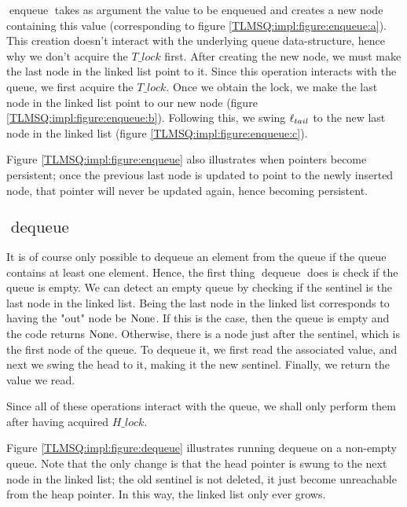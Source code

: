 \documentclass[twoside,11pt,openright]{report}
\newcommand{\enqueue}{\operatorname{enqueue}}
\newcommand{\dequeue}{\operatorname{dequeue}}
\begin{document}
$\enqueue$ takes as argument the value to be enqueued and creates a new node containing this value (corresponding to figure \ref{TLMSQ:impl:figure:enqueue:a}). This creation doesn't interact with the underlying queue data-structure, hence why we don't acquire the $T\_lock$ first. After creating the new node, we must make the last node in the linked list point to it. Since this operation interacts with the queue, we first acquire the $T\_lock$. Once we obtain the lock, we make the last node in the linked list point to our new node (figure \ref{TLMSQ:impl:figure:enqueue:b}). Following this, we swing $\ell_{tail}$ to the new last node in the linked list (figure \ref{TLMSQ:impl:figure:enqueue:c}).

Figure \ref{TLMSQ:impl:figure:enqueue} also illustrates when pointers become persistent; once the previous last node is updated to point to the newly inserted node, that pointer will never be updated again, hence becoming persistent.

\subsection[dequeue]{$\dequeue$}

It is of course only possible to dequeue an element from the queue if the queue contains at least one element. Hence, the first thing $\dequeue$ does is check if the queue is empty. We can detect an empty queue by checking if the sentinel is the last node in the linked list. Being the last node in the linked list corresponds to having the "out" node be $\operatorname{None}$. If this is the case, then the queue is empty and the code returns $\operatorname{None}$. Otherwise, there is a node just after the sentinel, which is the first node of the queue. To dequeue it, we first read the associated value, and next we swing the head to it, making it the new sentinel. Finally, we return the value we read.

Since all of these operations interact with the queue, we shall only perform them after having acquired $H\_lock$.

Figure \ref{TLMSQ:impl:figure:dequeue} illustrates running dequeue on a non-empty queue. Note that the only change is that the head pointer is swung to the next node in the linked list; the old sentinel is not deleted, it just become unreachable from the heap pointer. In this way, the linked list only ever grows.
\end{document}
